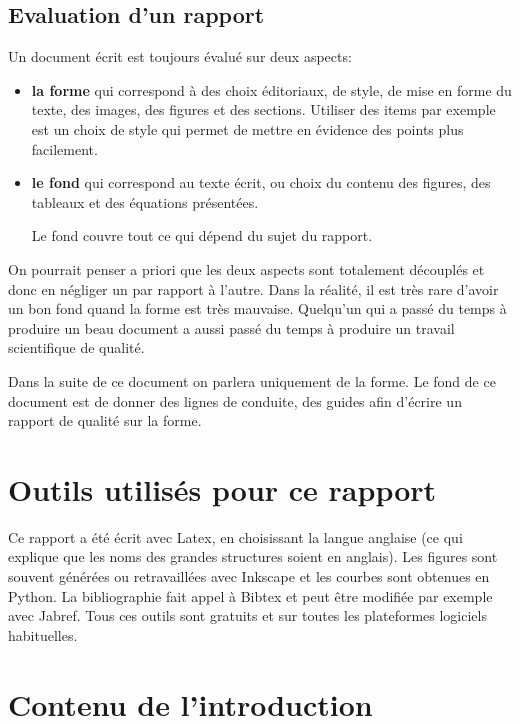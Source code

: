 \subsection{Evaluation d'un rapport}

Un document écrit est toujours évalué sur deux aspects:

\begin{itemize}
\item \textbf{la forme} qui correspond à des choix éditoriaux, de style, de mise en forme du texte, des images, des figures et des sections. 
Utiliser des items par exemple est un choix de style qui permet de mettre en évidence des points plus facilement.
\item \textbf{le fond} 
 qui  correspond au texte écrit, ou choix du contenu des figures,
  des tableaux et  des équations présentées.
  
  Le fond couvre tout ce qui dépend  du sujet du rapport.
\end{itemize}


On pourrait  penser a priori que les deux aspects sont totalement découplés et donc en négliger un par rapport à l'autre.
Dans la réalité, il est très rare d'avoir un bon fond quand la forme est très mauvaise. Quelqu'un qui a passé 
du temps à produire un beau document a aussi 
passé du temps à produire un travail scientifique de qualité.

Dans la suite de ce document on parlera uniquement de la forme. 
Le fond de ce document est de donner des lignes de conduite, des guides
afin d'écrire un rapport de qualité sur la forme.


\section{Outils utilisés pour ce rapport}

Ce rapport a été écrit avec Latex, en choisissant la langue anglaise (ce qui explique que les noms des grandes structures soient en anglais).
Les figures sont souvent générées ou retravaillées avec Inkscape et les courbes sont obtenues en Python.
La bibliographie fait appel à Bibtex et peut être modifiée par exemple avec Jabref. Tous ces outils sont gratuits et sur toutes les plateformes
logiciels habituelles.


\section{Contenu de l'introduction}

